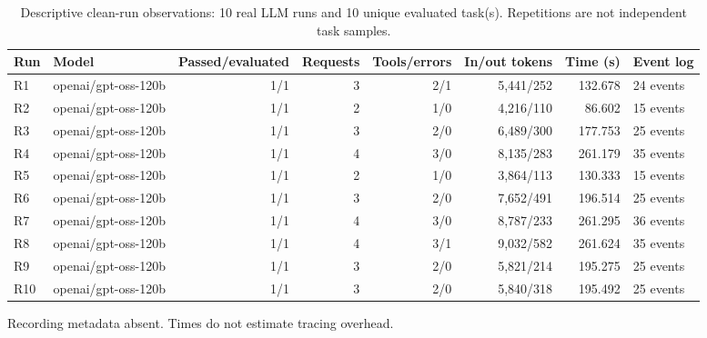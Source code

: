 \begin{table}[t]
\centering
\small
\caption{Descriptive clean-run observations: 10 real LLM runs and 10 unique evaluated task(s). Repetitions are not independent task samples.}
\begin{tabular}{llrrrrrl}
\toprule
Run & Model & Passed/evaluated & Requests & Tools/errors & In/out tokens & Time (s) & Event log \\
\midrule
R1 & openai/gpt-oss-120b & 1/1 & 3 & 2/1 & 5,441/252 & 132.678 & 24 events \\
R2 & openai/gpt-oss-120b & 1/1 & 2 & 1/0 & 4,216/110 & 86.602 & 15 events \\
R3 & openai/gpt-oss-120b & 1/1 & 3 & 2/0 & 6,489/300 & 177.753 & 25 events \\
R4 & openai/gpt-oss-120b & 1/1 & 4 & 3/0 & 8,135/283 & 261.179 & 35 events \\
R5 & openai/gpt-oss-120b & 1/1 & 2 & 1/0 & 3,864/113 & 130.333 & 15 events \\
R6 & openai/gpt-oss-120b & 1/1 & 3 & 2/0 & 7,652/491 & 196.514 & 25 events \\
R7 & openai/gpt-oss-120b & 1/1 & 4 & 3/0 & 8,787/233 & 261.295 & 36 events \\
R8 & openai/gpt-oss-120b & 1/1 & 4 & 3/1 & 9,032/582 & 261.624 & 35 events \\
R9 & openai/gpt-oss-120b & 1/1 & 3 & 2/0 & 5,821/214 & 195.275 & 25 events \\
R10 & openai/gpt-oss-120b & 1/1 & 3 & 2/0 & 5,840/318 & 195.492 & 25 events \\
\bottomrule
\end{tabular}
\par\footnotesize * Recording metadata absent. Times do not estimate tracing overhead.
\end{table}
